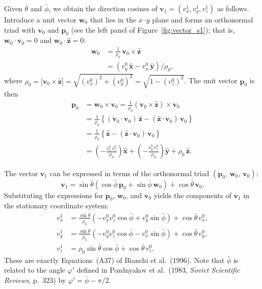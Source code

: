 \documentclass[english,a4paper]{kiseon_memo}
\begin{document}
Given $\bar\theta$ and $\bar\phi$, we obtain the direction cosines
of $\mathbf{v}_{1} = (v_{x}^{1}, v_{y}^{1}, v_{z}^{1})$ as
follows. Introduce a unit vector $\mathbf{w}_{0}$ that lies in the
$x$--$y$ plane and forms an orthonormal triad with $\mathbf{v}_{0}$
and $\mathbf{p}_{0}$ (see the left panel of
Figure~\ref{fig:vector_s1}); that is,
$\mathbf{w}_{0}\!\cdot\!\mathbf{v}_{0}=0$ and
$\mathbf{w}_{0}\!\cdot\!\hat{\mathbf{z}}=0$:
\begin{align*}
\mathbf{w}_{0} & = \frac{1}{\rho_{0}}\,\mathbf{v}_{0}\times\hat{\mathbf{z}}\\
& = \left(v_{y}^{0}\,\hat{\mathbf{x}} - v_{x}^{0}\,\hat{\mathbf{y}}\right)/\rho_{0},
\end{align*}
where
$\rho_{0}=|\mathbf{v}_{0}\times\hat{\mathbf{z}}|=\sqrt{(v_{x}^{0})^{2}+(v_{y}^{0})^{2}}=\sqrt{1-(v_{z}^{0})^{2}}$.
The unit vector $\mathbf{p}_{0}$ is then
\begin{align*}
\mathbf{p}_{0} & = \mathbf{w}_{0}\times\mathbf{v}_{0}
   = \frac{1}{\rho_{0}}\!\left(\mathbf{v}_{0}\times\hat{\mathbf{z}}\right)\times\mathbf{v}_{0}\\
& = \frac{1}{\rho_{0}}\!\left\{(\mathbf{v}_{0}\!\cdot\!\mathbf{v}_{0})\,\hat{\mathbf{z}} - (\hat{\mathbf{z}}\!\cdot\!\mathbf{v}_{0})\,\mathbf{v}_{0}\right\}\\
& = \frac{1}{\rho_{0}}\!\left\{\hat{\mathbf{z}} - (\hat{\mathbf{z}}\!\cdot\!\mathbf{v}_{0})\,\mathbf{v}_{0}\right\}\\
& = \left(-\frac{v_{x}^{0}\,v_{z}^{0}}{\rho_{0}}\right)\hat{\mathbf{x}} + \left(-\frac{v_{y}^{0}\,v_{z}^{0}}{\rho_{0}}\right)\hat{\mathbf{y}} + \rho_{0}\,\hat{\mathbf{z}}.
\end{align*}

The vector $\mathbf{v}_{1}$ can be expressed in terms of the
orthonormal triad $(\mathbf{p}_{0},\,\mathbf{w}_{0},\,\mathbf{v}_{0})$:
\[
\mathbf{v}_{1} = \sin\bar{\theta}\!\left(\cos\bar{\phi}\,\mathbf{p}_{0} + \sin\bar{\phi}\,\mathbf{w}_{0}\right) + \cos\bar{\theta}\,\mathbf{v}_{0}.
\]
Substituting the expressions for $\mathbf{p}_{0}$,
$\mathbf{w}_{0}$, and $\mathbf{v}_{0}$ yields the components of
$\mathbf{v}_{1}$ in the stationary coordinate system:
\begin{align*}
v_{x}^{1} & = \frac{\sin\bar{\theta}}{\rho_{0}}\!\left(-v_{x}^{0}v_{z}^{0}\cos\bar{\phi} + v_{y}^{0}\sin\bar{\phi}\right) + \cos\bar{\theta}\,v_{x}^{0},\\
v_{y}^{1} & = \frac{\sin\bar{\theta}}{\rho_{0}}\!\left(-v_{y}^{0}v_{z}^{0}\cos\bar{\phi} - v_{x}^{0}\sin\bar{\phi}\right) + \cos\bar{\theta}\,v_{y}^{0},\\
v_{z}^{1} & = \rho_{0}\sin\bar{\theta}\cos\bar{\phi} + \cos\bar{\theta}\,v_{z}^{0}.
\end{align*}
These are exactly Equations~(A37) of Bianchi et al.\ (1996). Note
that $\bar\phi$ is related to the angle $\varphi'$ defined in
Pozdnyakov et al.\ (1983, \textit{Soviet Scientific Reviews},
p.~323) by $\varphi' = \bar\phi - \pi/2$.
\end{document}
